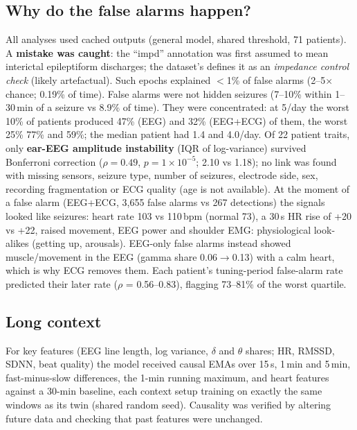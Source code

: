\subsection{Why do the false alarms happen?}

All analyses used cached outputs (general model, shared threshold, 71 patients). A \textbf{mistake was caught}: the ``impd'' annotation was first assumed to mean interictal epileptiform discharges; the dataset's  defines it as an \emph{impedance control check} (likely artefactual). Such epochs explained $<$1\% of false alarms (2--5$\times$ chance; 0.19\% of time). False alarms were not hidden seizures (7--10\% within 1--30\,min of a seizure vs 8.9\% of time). They were concentrated: at 5/day the worst 10\% of patients produced 47\% (EEG) and 32\% (EEG+ECG) of them, the worst 25\% 77\% and 59\%; the median patient had 1.4 and 4.0/day. Of 22 patient traits, only \textbf{ear-EEG amplitude instability} (IQR of log-variance) survived Bonferroni correction ($\rho=0.49$, $p=1\times10^{-5}$; 2.10 vs 1.18); no link was found with missing sensors, seizure type, number of seizures, electrode side, sex, recording fragmentation or ECG quality (age is not available). At the moment of a false alarm (EEG+ECG, 3,655 false alarms vs 267 detections) the signals looked like seizures: heart rate 103 vs 110\,bpm (normal 73), a 30\,s HR rise of +20 vs +22, raised movement, EEG power and shoulder EMG: physiological look-alikes (getting up, arousals). EEG-only false alarms instead showed muscle/movement in the EEG (gamma share 0.06$\to$0.13) with a calm heart, which is why ECG removes them. Each patient's tuning-period false-alarm rate predicted their later rate ($\rho$ = 0.56--0.83), flagging 73--81\% of the worst quartile.

\subsection{Long context}

For key features (EEG line length, log variance, $\delta$ and $\theta$ shares; HR, RMSSD, SDNN, beat quality) the model received causal EMAs over 15\,s, 1\,min and 5\,min, fast-minus-slow differences, the 1-min running maximum, and heart features against a 30-min baseline, each context setup training on exactly the same windows as its twin (shared random seed). Causality was verified by altering future data and checking that past features were unchanged.

